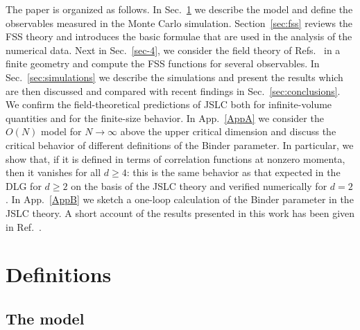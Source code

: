 \documentclass[12pt]{article}
\begin{document}
The paper is organized as follows.
In Sec.~\ref{sec-2} we describe the model and define the
observables measured in the Monte Carlo simulation.
Section~\ref{sec:fss} reviews the FSS theory and introduces the 
basic formulae that are used in the analysis
of  the numerical data.  Next in Sec.~\ref{sec-4}, we consider the 
field theory of Refs.~\cite{Janssen86a,Leung86} in a finite 
geometry and compute the FSS functions for several observables. 
In Sec.~\ref{sec:simulations} we describe the
simulations and present the results which are then discussed 
and compared with recent findings \cite{AGMM,AS-02}
in Sec.~\ref{sec:conclusions}. 
We confirm the field-theoretical predictions of JSLC 
both for infinite-volume quantities and for the finite-size behavior.
In App.~\ref{AppA} we consider the $O(N)$ model for $N\to \infty$ above the 
upper critical dimension and discuss the critical behavior of different 
definitions of the Binder parameter. In particular, we show that, if 
it is defined in terms of correlation functions at nonzero 
momenta, then it vanishes for all $d\ge 4$: this is the same behavior
as that expected in the DLG for $d \ge 2$ on the basis of the JSLC theory 
and verified numerically  for $d=2$. In App.~\ref{AppB} we sketch a 
one-loop calculation of the Binder parameter in the JSLC theory.
A short account of the results presented in this work has been given in 
Ref.~\cite{CGGP-02}.


\section{Definitions}
\label{sec-2}

\subsection{The model}
\label{sec-2.1}
\end{document}

